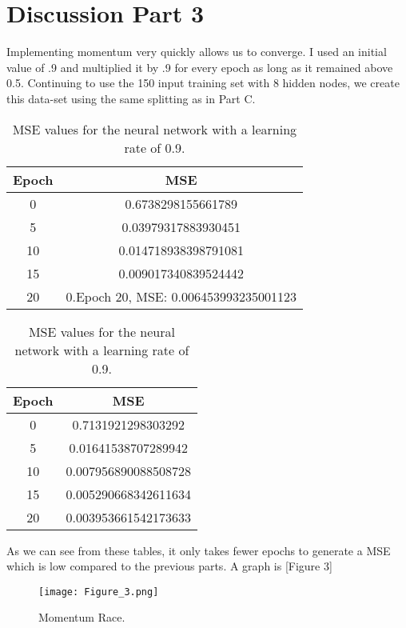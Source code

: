 \documentclass[12pt]{article}
\begin{document}
\section{Discussion Part 3}
Implementing momentum very quickly allows us to converge. I used an initial value of .9 and multiplied it by .9 for every epoch as long as it remained above 0.5. Continuing to use the 150 input training set with 8 hidden nodes, we create this data-set using the same splitting as in Part C. 

\begin{table}[h]
    \centering
    \begin{tabular}{c|c}
        \hline
        \textbf{Epoch} & \textbf{MSE} \\
        \hline
        0 & 0.6738298155661789 \\
        5 & 0.03979317883930451 \\
        10 & 0.014718938398791081 \\
        15 & 0.009017340839524442 \\
        20 & 0.Epoch 20, MSE: 0.006453993235001123
 \\
        \hline
    \end{tabular}
    \caption{MSE values for the neural network with a learning rate of 0.9.}
    \label{table:neural_network}
\end{table}

\begin{table}[h]
    \centering
    \begin{tabular}{c|c}
        \hline
        \textbf{Epoch} & \textbf{MSE} \\
        \hline
        0 & 0.7131921298303292 \\
        5 & 0.01641538707289942 \\
        10 & 0.007956890088508728 \\
        15 & 0.005290668342611634 \\
        20 & 0.003953661542173633 \\
        \hline
    \end{tabular}
    \caption{MSE values for the neural network with a learning rate of 0.9.}
    \label{table:neural_network}
\end{table}


As we can see from these tables, it only takes fewer epochs to generate 
a MSE which is low compared to the previous parts. A graph is [Figure 3]

\begin{figure}[h]
  \centering
  \texttt{[image: Figure\_3.png]}
  \caption{Momentum Race.}
  \label{fig:my_label}
\end{figure}
\end{document}
